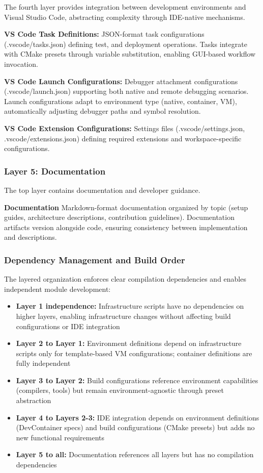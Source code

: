 The fourth layer provides integration between development environments and Visual Studio Code, abstracting complexity through IDE-native mechanisms.

\textbf{VS Code Task Definitions:} JSON-format task configurations (.vscode/tasks.json) defining test, and deployment operations.
Tasks integrate with CMake presets through variable substitution, enabling GUI-based workflow invocation.

\textbf{VS Code Launch Configurations:} Debugger attachment configurations (.vscode/launch.json) supporting both native and remote debugging scenarios.
Launch configurations adapt to environment type (native, container, VM), automatically adjusting debugger paths and symbol resolution.

\textbf{VS Code Extension Configurations:} Settings files (.vscode/settings.json, .vscode/extensions.json) defining required extensions and workspace-specific configurations.

\subsubsection{Layer 5: Documentation}

The top layer contains documentation and developer guidance.

\textbf{Documentation} Markdown-format documentation organized by topic (setup guides, architecture descriptions, contribution guidelines).
Documentation artifacts version alongside code, ensuring consistency between implementation and descriptions.

\subsubsection{Dependency Management and Build Order}

The layered organization enforces clear compilation dependencies and enables independent module development:

\begin{itemize}
\item \textbf{Layer 1 independence:} Infrastructure scripts have no dependencies on higher layers, enabling infrastructure changes without affecting build configurations or IDE integration
\item \textbf{Layer 2 to Layer 1:} Environment definitions depend on infrastructure scripts only for template-based VM configurations; container definitions are fully independent
\item \textbf{Layer 3 to Layer 2:} Build configurations reference environment capabilities (compilers, tools) but remain environment-agnostic through preset abstraction
\item \textbf{Layer 4 to Layers 2-3:} IDE integration depends on environment definitions (DevContainer specs) and build configurations (CMake presets) but adds no new functional requirements
\item \textbf{Layer 5 to all:} Documentation references all layers but has no compilation dependencies
\end{itemize}

